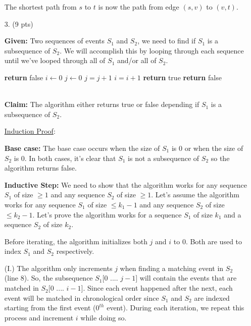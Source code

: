 \documentclass[11pt]{article}
\begin{document}
\begin{itemize}
The shortest path from $s$ to $t$ is now the path from edge $(s, v)$ to $(v,t)$.


\item[$3.$] (9 pts)

{\bf Given:} Two sequences of events $S_1$ and $S_2$, we need to find if $S_1$ is a subsequence of $S_2$. We will accomplish this by looping through each sequence until we've looped through all of $S_1$ and/or all of $S_2$.

\begin{algorithmic}[1]
		\State \textbf{return} false
	\EndIf
	\State $i \gets 0$
	\State $j \gets 0$
			\State $j = j + 1$
		\EndIf
		\State $i = i + 1$
	\EndWhile
		\State \textbf{return} true
	\Else
		\State \textbf{return} false
	\EndIf
\EndFunction 
\end{algorithmic}

\-\\
{\bf Claim:} The algorithm either returns true or false depending if $S_1$ is a subsequence of $S_2$.

\underline{Induction Proof}:

{\bf Base case:} The base case occurs when the size of $S_1$ is 0 or when the size of $S_2$ is 0. In both cases, it's clear that $S_1$ is not a subsequence of $S_2$ so the algorithm returns false.

{\bf Inductive Step:} We need to show that the algorithm works for any sequence $S_1$ of size $\geq 1$ and any sequence $S_2$ of size $\geq 1$. Let's assume the algorithm works for any sequence $S_1$ of size $\leq k_1 - 1$ and any sequence $S_2$ of size $\leq k_2 - 1$. Let's prove the algorithm works for a sequence $S_1$ of size $k_1$ and a sequence $S_2$ of size $k_2$.

Before iterating, the algorithm initializes both $j$ and $i$ to 0. Both are used to index $S_1$ and $S_2$ respectively.

(I.) The algorithm only increments $j$ when finding a matching event in $S_2$ (line 8). So, the subsequence $S_1[0$ .... $j-1]$ will contain the events that are matched in $S_2[0$ .... $i-1]$. Since each event happened after the next, each event will be matched in chronological order since $S_1$ and $S_2$ are indexed starting from the first event ($0^{th}$ event). During each iteration, we repeat this process and increment $i$ while doing so.


\end{itemize}
\end{document}
